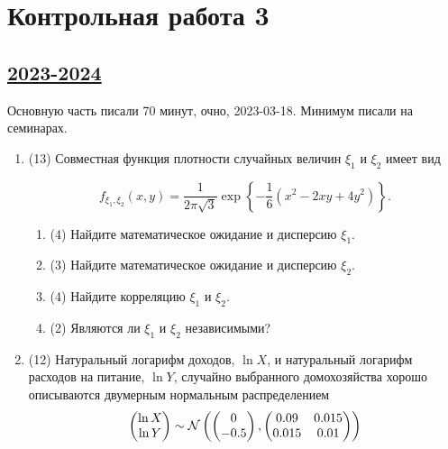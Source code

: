 \newpage
\thispagestyle{empty}

\section{Контрольная работа 3}


\subsection[2023-2024]{\hyperref[sec:sol_kr_03_2023_2024]{2023-2024}}
\label{sec:kr_03_2023_2024}

Основную часть писали 70 минут, очно, 2023-03-18. Минимум писали на семинарах. 

\begin{enumerate}
  \item (13) Совместная функция плотности случайных величин $\xi_1$ и $\xi_2$ имеет вид

\[  
  f_{\xi_1,\xi_2}(x,y)=\frac{1}{2\pi\sqrt 3}\exp\left\{-\frac{1}{6}(x^2-2x y+4y^2)\right\}.
\]

\begin{enumerate}
\item  (4) Найдите математическое ожидание и дисперсию $\xi_1$.
\item  (3) Найдите математическое ожидание и дисперсию $\xi_2$.
\item  (4) Найдите корреляцию $\xi_1$ и $\xi_2$. 
\item  (2) Являются ли $\xi_1$ и $\xi_2$ независимыми?
\end{enumerate}

\item (12) Натуральный логарифм доходов, $\ln X$, и натуральный логарифм расходов на питание, $\ln Y$, 
случайно выбранного домохозяйства хорошо описываются двумерным нормальным распределением 
\[
\begin{pmatrix}
  \ln X \\
  \ln Y
\end{pmatrix} \sim 
\mathcal{N} \left(
  \begin{pmatrix}
    0\\
    -0.5\\
  \end{pmatrix}, 
  \begin{pmatrix}
    0.09 & 0.015\\
    0.015 & 0.01 \\
  \end{pmatrix}
  \right)
\]
 

\end{enumerate}
